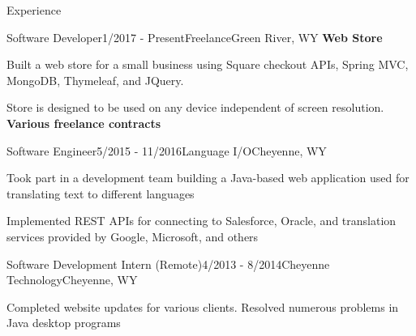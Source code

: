 \documentclass{resume} %
\begin{document}
\begin{rSection}{Experience}
	
	\begin{rSubEmploymentSection}{Software Developer}{1/2017 - Present}{Freelance}{Green River, WY}
		{\bf Web Store}
		\item Built a web store for a small business using Square checkout APIs, Spring MVC, MongoDB, Thymeleaf, and JQuery. 
		\item Store is designed to be used on any device independent of screen resolution. \\
		{\bf Various freelance contracts}
	\end{rSubEmploymentSection}	
	
	\begin{rSubEmploymentSection}{Software Engineer}{5/2015 - 11/2016}{Language I/O}{Cheyenne, WY}
		\item Took part in a development team building a Java-based web application used for translating text to different languages
		\item Implemented REST APIs for connecting to Salesforce, Oracle, and translation services provided by Google, Microsoft, and others
	\end{rSubEmploymentSection}
		
	\begin{rSubEmploymentSection}{Software Development Intern (Remote)}{4/2013 - 8/2014}{Cheyenne Technology}{Cheyenne, WY}
		\item Completed website updates for various clients. Resolved numerous problems in Java desktop programs
	\end{rSubEmploymentSection}
		

\end{rSection}
\end{document}
